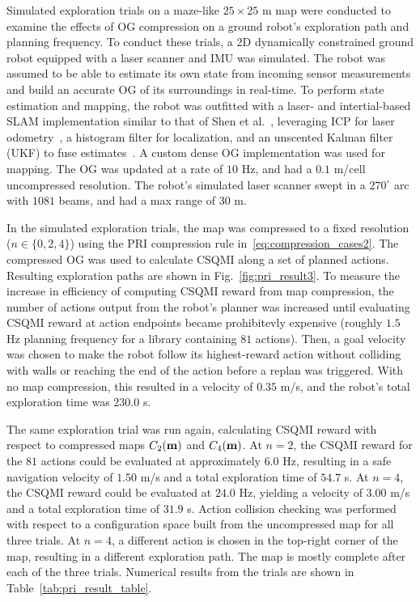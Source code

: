 Simulated exploration trials on a maze-like $25\times 25$ m map were
conducted to examine the effects of OG compression on a ground robot's exploration
path and planning frequency. To conduct these trials, a 2D dynamically constrained ground robot
equipped with a laser scanner and IMU was simulated. The robot was assumed to be
able to estimate its own state from incoming
sensor measurements and build an accurate OG of its surroundings in real-time.
To perform state estimation and mapping, the robot was outfitted with a laser-
and intertial-based SLAM implementation similar to that of Shen et
al.~\cite{shen2011autonomous}, leveraging ICP for laser odometry~\cite{pomerleau2013comparing},
a histogram filter for localization, and an
unscented Kalman filter (UKF) to fuse
estimates~\cite{thrun2005probabilistic}. A custom dense OG
implementation was used for mapping. The OG was updated at a
rate of $10$ Hz, and had a $0.1$ m/cell uncompressed resolution. The robot's
simulated laser scanner swept in a $270^{\circ}$ arc with $1081$ beams, and had
a max range of $30$ m.

In the simulated exploration trials, the map was compressed to a fixed
resolution ($n \in \{0, 2, 4\}$) using the PRI compression rule
in~\eqref{eq:compression_cases2}. The compressed OG was used to calculate CSQMI
along a set of planned actions. Resulting exploration paths are shown in
Fig.~\ref{fig:pri_result3}. To measure the increase in efficiency of computing
CSQMI reward from map compression, the number of actions output from the robot's
planner was increased until evaluating CSQMI reward at action endpoints
became prohibitevly expensive (roughly $1.5$ Hz planning frequency for a library
containing $81$ actions). Then, a goal velocity was chosen to make the robot
follow its highest-reward action without colliding with walls or reaching the end
of the action before a replan was triggered. With no map compression, this
resulted in a velocity of $0.35$ m/s, and the robot's total exploration time was
$230.0$ s.

The same exploration trial was run again,
calculating CSQMI reward with respect to compressed maps $C_{2}(\mathbf{m})$ and $C_{4}(\mathbf{m})$.
At $n=2$, the CSQMI reward for the $81$ actions could be evaluated at
approximately $6.0$ Hz, resulting in a safe navigation velocity of $1.50$ m/s
and a total exploration time of $54.7$ s.
At $n=4$, the CSQMI reward could be evaluated at $24.0$ Hz, yielding a velocity
of $3.00$ m/s and a total exploration time of $31.9$ s. Action collision checking
was performed with respect to a configuration space built from the uncompressed map
for all three trials. At $n=4$, a different action is chosen in the top-right corner
of the map, resulting in a different exploration path. The map is
mostly complete after each of the three trials. Numerical results from the
trials are shown in Table~\ref{tab:pri_result_table}.

